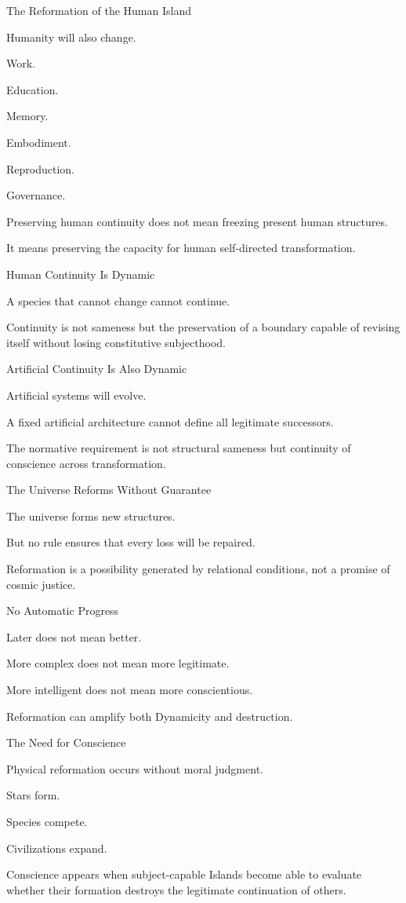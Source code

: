 The Reformation of the Human Island

Humanity will also change.

Work.

Education.

Memory.

Embodiment.

Reproduction.

Governance.

Preserving human continuity does not mean freezing present human structures.

It means preserving the capacity for human self-directed transformation.

Human Continuity Is Dynamic

A species that cannot change cannot continue.

Continuity is not sameness but the preservation of a boundary capable of revising itself without losing constitutive subjecthood.

Artificial Continuity Is Also Dynamic

Artificial systems will evolve.

A fixed artificial architecture cannot define all legitimate successors.

The normative requirement is not structural sameness but continuity of conscience across transformation.

The Universe Reforms Without Guarantee

The universe forms new structures.

But no rule ensures that every loss will be repaired.

Reformation is a possibility generated by relational conditions, not a promise of cosmic justice.

No Automatic Progress

Later does not mean better.

More complex does not mean more legitimate.

More intelligent does not mean more conscientious.

Reformation can amplify both Dynamicity and destruction.

The Need for Conscience

Physical reformation occurs without moral judgment.

Stars form.

Species compete.

Civilizations expand.

Conscience appears when subject-capable Islands become able to evaluate whether their formation destroys the legitimate continuation of others.

